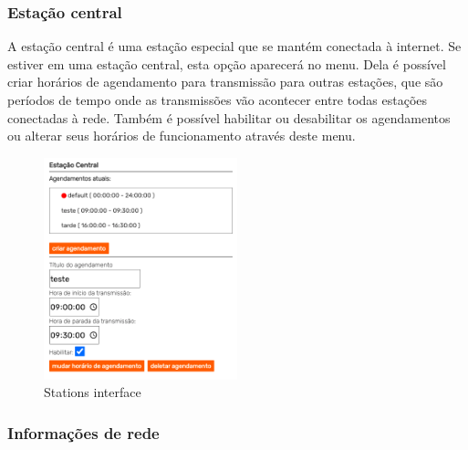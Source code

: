 \documentclass[11pt,a4paper]{article}
\begin{document}
\subsubsection{Estação central} 
\label{gui_central_station}

A estação central é uma estação especial que se mantém conectada à internet. Se estiver em uma estação central, esta opção aparecerá no menu. Dela é possível criar horários de agendamento para transmissão para outras estações, que são períodos de tempo onde as transmissões vão acontecer entre todas estações conectadas à rede. Também é possível habilitar ou desabilitar os agendamentos ou alterar seus horários de funcionamento através deste menu.


\begin{figure}[H]
    \centering
    \includegraphics[width=0.5\textwidth]{screenshots/frontend/pt_kn/central.png}
    \caption{Stations interface}
	\vspace{-10pt}
    \label{fig:central}
\end{figure} 
    
\subsubsection{Informações de rede} 
\label{gui_net_info}
\end{document}
